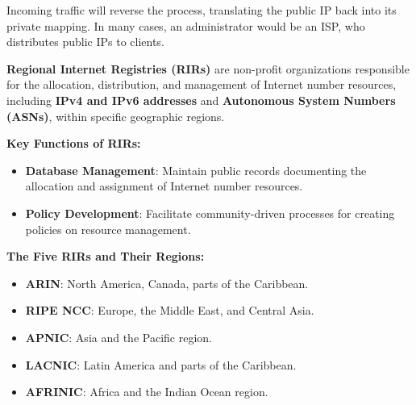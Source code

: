 \noindent
Incoming traffic will reverse the process, translating the public IP back into its private mapping. In many 
cases, an administrator would be an ISP, who distributes public IPs to clients.

\newpage 

\begin{Def}

    \textbf{Regional Internet Registries (RIRs)} are non-profit organizations responsible for the allocation, distribution, and management of Internet number resources, including \textbf{IPv4 and IPv6 addresses} and \textbf{Autonomous System Numbers (ASNs)}, within specific geographic regions.
    
    \noindent
    \textbf{Key Functions of RIRs:}
    \begin{itemize}
        \item \textbf{Database Management}: Maintain public records documenting the allocation and assignment of Internet number resources.
        \item \textbf{Policy Development}: Facilitate community-driven processes for creating policies on resource management.
    \end{itemize}

    \noindent
    \textbf{The Five RIRs and Their Regions:}
    \begin{itemize}
        \item \textbf{ARIN}: North America, Canada, parts of the Caribbean.
        \item \textbf{RIPE NCC}: Europe, the Middle East, and Central Asia.
        \item \textbf{APNIC}: Asia and the Pacific region.
        \item \textbf{LACNIC}: Latin America and parts of the Caribbean.
        \item \textbf{AFRINIC}: Africa and the Indian Ocean region.
    \end{itemize}
    
    \hfill \cite{rir_overview}
\end{Def}


